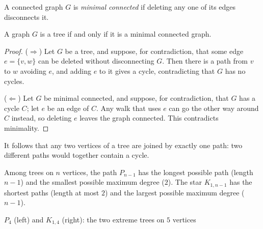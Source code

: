 \begin{definition}
A connected graph $G$ is \emph{minimal connected} if deleting any one of its edges disconnects it.
\end{definition}

\begin{theorem}[CN Thm 66]
A graph $G$ is a tree if and only if it is a minimal connected graph.
\end{theorem}
\begin{proof}
($\Rightarrow$) Let $G$ be a tree, and suppose, for contradiction, that some edge $e=\{v,w\}$ can be deleted without disconnecting $G$. Then there is a path from $v$ to $w$ avoiding $e$, and adding $e$ to it gives a cycle, contradicting that $G$ has no cycles.

($\Leftarrow$) Let $G$ be minimal connected, and suppose, for contradiction, that $G$ has a cycle $C$; let $e$ be an edge of $C$. Any walk that uses $e$ can go the other way around $C$ instead, so deleting $e$ leaves the graph connected. This contradicts minimality.
\end{proof}

\begin{note}
It follows that any two vertices of a tree are joined by exactly one path: two different paths would together contain a cycle.
\end{note}

\begin{note}
Among trees on $n$ vertices, the path $P_{n-1}$ has the longest possible path (length $n-1$) and the smallest possible maximum degree ($2$). The star $K_{1,n-1}$ has the shortest paths (length at most $2$) and the largest possible maximum degree ($n-1$).
\end{note}

\begin{center}
\qquad
{}
\end{center}
\begin{center}
\small $P_4$ (left) and $K_{1,4}$ (right): the two extreme trees on $5$ vertices
\end{center}

